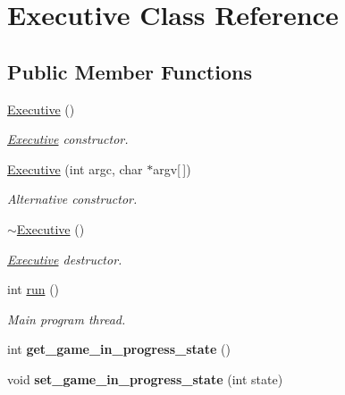 \hypertarget{classExecutive}{}\section{Executive Class Reference}
\label{classExecutive}
\subsection*{Public Member Functions}
\begin{DoxyCompactItemize}
\item 
\mbox{\hyperlink{classExecutive_ad870c1d741f1f313eb0c5a8336f8af6b}{Executive}} ()
\begin{DoxyCompactList}\small\item\em \mbox{\hyperlink{classExecutive}{Executive}} constructor. \end{DoxyCompactList}\item 
\mbox{\hyperlink{classExecutive_a45c48b992ab4d768131b67d8c43bd32e}{Executive}} (int argc, char $\ast$argv\mbox{[}$\,$\mbox{]})
\begin{DoxyCompactList}\small\item\em Alternative constructor. \end{DoxyCompactList}\item 
\mbox{\label{classExecutive_a4ce80c499f7640b1770ade77cf56d965}} 
\mbox{\hyperlink{classExecutive_a4ce80c499f7640b1770ade77cf56d965}{$\sim$\+Executive}} ()
\begin{DoxyCompactList}\small\item\em \mbox{\hyperlink{classExecutive}{Executive}} destructor. \end{DoxyCompactList}\item 
int \mbox{\hyperlink{classExecutive_ae73fbe9374b4f5362fa224dc18e601a7}{run}} ()
\begin{DoxyCompactList}\small\item\em Main program thread. \end{DoxyCompactList}\item 
\mbox{\label{classExecutive_aa18c7d0914c7332188968681132809d0}} 
int {\bfseries get\+\_\+game\+\_\+in\+\_\+progress\+\_\+state} ()
\item 
\mbox{\label{classExecutive_ac2be719a9026307aeb3dbc2e81297a84}} 
void {\bfseries set\+\_\+game\+\_\+in\+\_\+progress\+\_\+state} (int state)

\end{DoxyCompactItemize}

